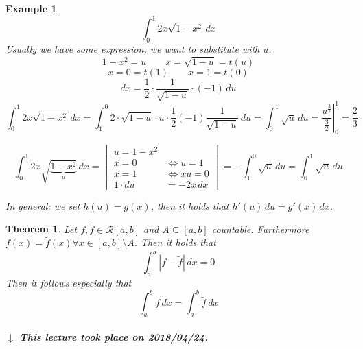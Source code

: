 \documentclass{article}
\newtheorem{theorem}{Theorem}  \numberwithin{theorem}{section}
\newtheorem{example}{Example}  \numberwithin{example}{section}
\newcommand{\card}[1]{\left|#1\right|}
\newcommand{\dateref}[1]{%
  \begin{mdframed}[backgroundcolor=gray!10,innerbottommargin=0pt,innertopmargin=0pt]
    \paragraph{\textit{$\downarrow$ This lecture took place on #1.}}%
  \end{mdframed}%
}
\begin{document}
\begin{example}
  \[ \int_0^1 2x \sqrt{1 - x^2} \, dx \]
  Usually we have some expression, we want to substitute with $u$.
  \[ 1 - x^2 = u \qquad x = \sqrt{1 - u} = t(u) \]
  \[ x = 0 = t(1) \qquad x = 1 = t(0) \]
  \[ dx = \frac12 \cdot \frac{1}{\sqrt{1 - u}} \cdot (-1) \, du \]
  \[ \int_0^1 2x \sqrt{1 - x^2} \, dx = \int_1^0 2 \cdot \sqrt{1 - u} \cdot u \cdot \frac12 (-1) \frac{1}{\sqrt{1 - u}} \, du = \int_0^1 \sqrt{u} \, du = \left. \frac{u^{\frac32}}{\frac32} \right|_0^1 = \frac23 \]

  \[
    \int_0^1 2x \sqrt{\underbrace{1 - x^2}_{u}} \, dx =
    \begin{vmatrix}
      u = 1 - x^2 & \\
      x = 0 & \Leftrightarrow u = 1 \\
      x = 1 & \Leftrightarrow xu = 0 \\
      1 \cdot du &= -2x \, dx
    \end{vmatrix}
    = -\int_1^0 \sqrt{u} \, du = \int_0^1 \sqrt{u} \, du
  \]

  In general: we set $h(u) = g(x)$, then it holds that $h'(u) \, du = g'(x) \, dx$.
\end{example}

\begin{theorem} %
  \label{satz7countable}
  Let $f, \tilde f \in \mathcal R[a,b]$ and $A \subseteq [a,b]$ countable.
  Furthermore $f(x) = \tilde f(x) \forall x \in [a,b] \setminus A$.
  Then it holds that
  \[ \int_a^b \card{f - \tilde f} \, dx = 0 \]
  Then it follows especially that
  \[ \int_a^b f \, dx = \int_a^b \tilde f \, dx \]
\end{theorem}

\dateref{2018/04/24}
\end{document}

